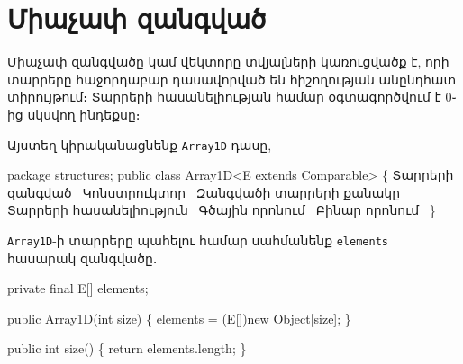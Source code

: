 \section{Միաչափ զանգված}

Միաչափ զանգվածը կամ վեկտորը տվյալների կառուցվածք է, որի տարրերը
հաջորդաբար դասավորված են հիշողության անընդհատ տիրույթում։ Տարրերի
հասանելիության համար օգտագործվում է \(0\)֊ից սկսվող ինդեքսը։

Այստեղ կիրականացնենք \texttt{Array1D} դասը,

\endmoddef{}
package structures;
public class Array1D<E extends Comparable> \{
    \LA{}Տարրերի զանգված~{\nwtagstyle{}}\RA{}
    \LA{}Կոնստրուկտոր~{\nwtagstyle{}}\RA{}
    \LA{}Զանգվածի տարրերի քանակը~{\nwtagstyle{}}\RA{}
    \LA{}Տարրերի հասանելիություն~{\nwtagstyle{}}\RA{}
    \LA{}Գծային որոնում~{\nwtagstyle{}}\RA{}
    \LA{}Բինար որոնում~{\nwtagstyle{}}\RA{}
\}
\nwendcode{}\nwdocspar

\texttt{Array1D}-ի տարրերը պահելու համար սահմանենք \texttt{elements} 
հասարակ զանգվածը․

\nwenddocs{}\endmoddef{}
private final E[] elements;
\nwendcode{}\nwdocspar

\nwenddocs{}\endmoddef{}
public Array1D(int size) \{
    elements = (E[])new Object[size];
\}
\nwendcode{}\nwdocspar

\nwenddocs{}\endmoddef{}
public int size() \{
    return elements.length;
\}
\nwendcode{}\nwdocspar

